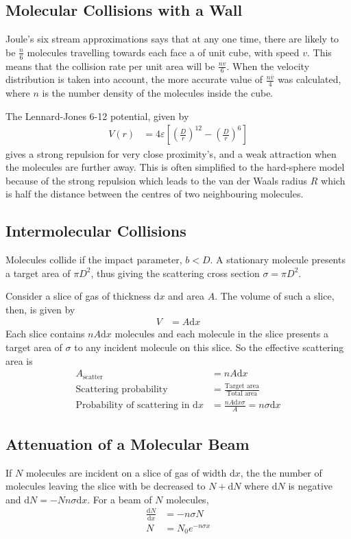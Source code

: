 \documentclass[british]{article}
\renewcommand{\d}{\mathrm{d}} %
\newcommand{\dx}[2]{\frac{\textrm{d} #1}{\textrm{d} #2}} %
\begin{document}
\subsection{Molecular Collisions with a Wall}
Joule's six stream approximations says that at any one time, there are likely to be $\frac{n}{6}$ molecules travelling towards each face a of unit cube, with speed $v$. This means that the collision rate per unit area will be $\frac{nv}{6}$. When the velocity distribution is taken into account, the more accurate value of $\frac{n\overline{v}}{4}$ was calculated, where $n$ is the number density of the molecules inside the cube.

The Lennard-Jones 6-12 potential, given by
\begin{align*}
	V(r) &= 4\varepsilon \left[ \left(\frac{D}{r}\right)^{12}-\left(\frac{D}{r}\right)^6 \right]
\end{align*}
gives a strong repulsion for very close proximity's, and a weak attraction when the molecules are further away. This is often simplified to the hard-sphere model because of the strong repulsion which leads to the van der Waals radius $R$ which is half the distance between the centres of two neighbouring molecules.

\subsection{Intermolecular Collisions}
Molecules collide if the impact parameter, $b<D$. A stationary molecule presents a target area of  $\pi D^2$, thus giving the scattering cross section $\sigma = \pi D^2$.

Consider a slice of gas of thickness $\d{x}$ and area $A$. The volume of such a slice, then, is given by 
\begin{align*}
	V &= A\d{x}
\end{align*}
Each slice contains $nA\d{x}$ molecules and each molecule in the slice presents a target area of $\sigma$ to any incident molecule on this slice. So the effective scattering area is
\begin{align*}
	A_{\text{scatter}} &= nA\d{x} \\
	\text{Scattering probability} &= \frac{\text{Target area}}{\text{Total area}} \\
	\text{Probability of scattering in }\d{x} &= \frac{nA\d{x}\sigma}{A} = n\sigma\d{x}
\end{align*}

\subsection{Attenuation of a Molecular Beam}
If $N$ molecules are incident on a slice of gas of width $\d{x}$, the the number of molecules leaving the slice with be decreased to $N+\d{N}$ where $\d{N}$ is negative and $\d{N}=-Nn\sigma\d{x}$. For a beam of $N$ molecules, 
\begin{align*}
	\dx{N}{x} &= -n\sigma N \\
	N &= N_0 e^{-n\sigma x}
\end{align*}
\end{document}
